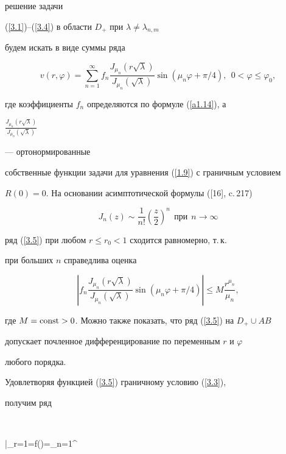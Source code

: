 решение задачи 


(\ref{3.1})--(\ref{3.4}) в области $D_+$ при $\lambda\ne\lambda_{n,m}$ 


будем искать в виде суммы ряда


\begin{equation}


v(r,\varphi)=\sum_{n=1}^\infty f_n\frac{J_{\mu_n}(r\sqrt \lambda)}{J_{\mu_n}


(\sqrt\lambda)}\sin(\mu_n\varphi+\pi/4),\ \ 


0<\varphi\leq\varphi_0,\label{3.5}


\end{equation}


где коэффициенты $f_n$ определяются по формуле (\ref{a1.14}), а


${\frac{J_{\mu_n}(r\sqrt\lambda)}{J_{\mu_n}(\sqrt\lambda)}}$


--- ортонормированные 


собственные функции задачи для уравнения (\ref{1.9}) с граничным условием 


$R(0)=0$. На основании асимптотической формулы ([16], c.\,217)


$$


J_n(z)\sim \frac{1}{n!}\left(\frac z2\right)^n\ \ \text{при}\ \ n\to\infty


$$


ряд (\ref{3.5}) при любом $r\leq r_0<1$ сходится равномерно, т.\,к.


при больших $n$ справедлива оценка


$$


\left|f_n\frac{J_{\mu_n}(r\sqrt\lambda)}{J_{\mu_n}(\sqrt\lambda)}\sin


\left(\mu_n\varphi+\pi/4\right)\right|


\le M \frac{r^{\mu_n}}{\mu_n},


$$


где $M=\operatorname{const}>0$. Можно также показать, что ряд (\ref{3.5}) на $D_+\cup AB$ 


допускает почленное дифференцирование по переменным $r$ и $\varphi$


любого порядка.





Удовлетворяя функцией (\ref{3.5}) граничному условию (\ref{3.3}),


получим ряд


$$


\bigg|_{r=1}=f(\varphi)=\sum_{n=1}^\infty 


